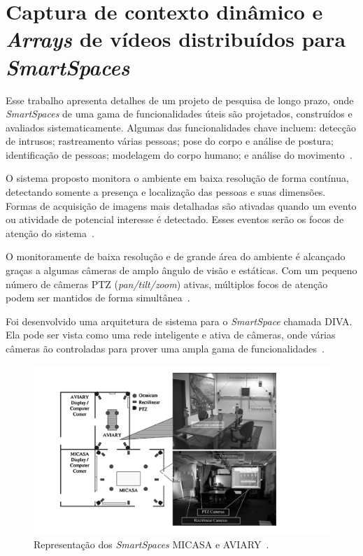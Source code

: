 \section{Captura de contexto dinâmico e \textit{Arrays} de vídeos distribuídos para \textit{SmartSpaces}}

Esse trabalho apresenta detalhes de um projeto de pesquisa de longo prazo, onde \textit{SmartSpaces} de uma gama de funcionalidades úteis são projetados, construídos e avaliados sistematicamente. Algumas das funcionalidades chave incluem: detecção de intrusos; rastreamento várias pessoas; pose do corpo e análise de postura; identificação de pessoas; modelagem do corpo humano; e análise do movimento~\cite{trivedi}.

O sistema proposto monitora o ambiente em baixa resolução de forma contínua, detectando somente a presença e localização das pessoas e suas dimensões. Formas de acquisição de imagens mais detalhadas são ativadas quando um evento ou atividade de potencial interesse é detectado. Esses eventos serão os focos de atenção do sistema~\cite{trivedi}.

O monitoramente de baixa resolução e de grande área do ambiente é alcançado graças a algumas câmeras de amplo ângulo de visão e estáticas. Com um pequeno número de câmeras PTZ (\textit{pan/tilt/zoom}) ativas, múltiplos focos de atenção podem ser mantidos de forma simultânea~\cite{trivedi}.

Foi desenvolvido uma arquitetura de sistema para o \textit{SmartSpace} chamada DIVA. Ela pode ser vista como uma rede inteligente e ativa de câmeras, onde várias câmeras ão controladas para prover uma ampla gama de funcionalidades~\cite{trivedi}.

	\begin{figure}[hbt]
		\begin{center}
			\includegraphics[scale=0.5]{figuras/3.TrabalhosCorrelatos/micasa_aviary.png}
		\end{center}
		\caption{Representação dos \textit{SmartSpaces} MICASA e AVIARY~\cite{trivedi}.}
		\label{micasa_aviary}
	\end{figure}

